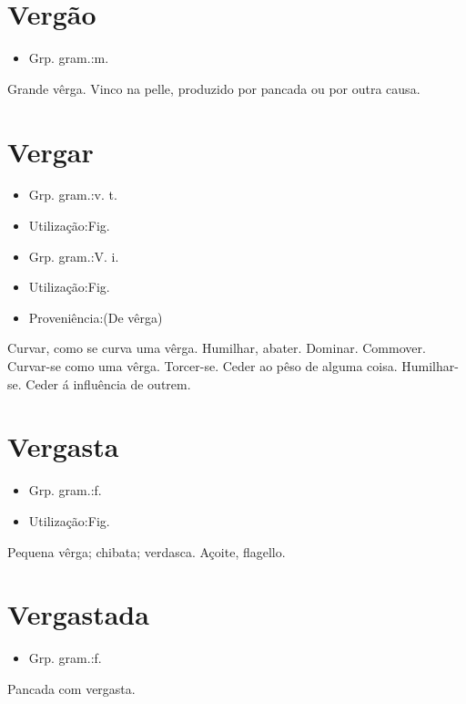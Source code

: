 \documentclass{article}
\begin{document}
\section{Vergão}
\begin{itemize}
\item {Grp. gram.:m.}
\end{itemize}
Grande vêrga.
Vinco na pelle, produzido por pancada ou por outra causa.
\section{Vergar}
\begin{itemize}
\item {Grp. gram.:v. t.}
\end{itemize}
\begin{itemize}
\item {Utilização:Fig.}
\end{itemize}
\begin{itemize}
\item {Grp. gram.:V. i.}
\end{itemize}
\begin{itemize}
\item {Utilização:Fig.}
\end{itemize}
\begin{itemize}
\item {Proveniência:(De \textunderscore vêrga\textunderscore )}
\end{itemize}
Curvar, como se curva uma vêrga.
Humilhar, abater.
Dominar.
Commover.
Curvar-se como uma vêrga.
Torcer-se.
Ceder ao pêso de alguma coisa.
Humilhar-se.
Ceder á influência de outrem.
\section{Vergasta}
\begin{itemize}
\item {Grp. gram.:f.}
\end{itemize}
\begin{itemize}
\item {Utilização:Fig.}
\end{itemize}
Pequena vêrga; chibata; verdasca.
Açoite, flagello.
\section{Vergastada}
\begin{itemize}
\item {Grp. gram.:f.}
\end{itemize}
Pancada com vergasta.
\end{document}
